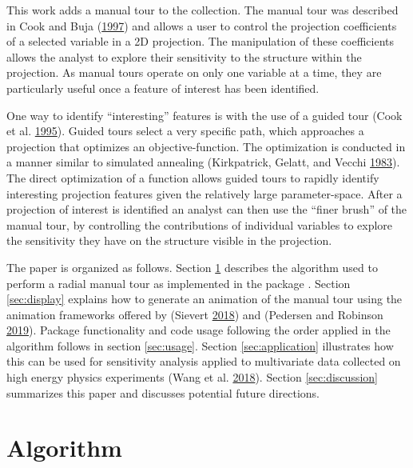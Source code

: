 This work adds a manual tour to the collection. The manual tour was
described in Cook and Buja
(\protect\hyperlink{ref-cook_manual_1997}{1997}) and allows a user to
control the projection coefficients of a selected variable in a 2D
projection. The manipulation of these coefficients allows the analyst to
explore their sensitivity to the structure within the projection. As
manual tours operate on only one variable at a time, they are
particularly useful once a feature of interest has been identified.

One way to identify ``interesting'' features is with the use of a guided
tour (Cook et al. \protect\hyperlink{ref-cook_grand_1995}{1995}). Guided
tours select a very specific path, which approaches a projection that
optimizes an objective-function. The optimization is conducted in a
manner similar to simulated annealing (Kirkpatrick, Gelatt, and Vecchi
\protect\hyperlink{ref-kirkpatrick_optimization_1983}{1983}). The direct
optimization of a function allows guided tours to rapidly identify
interesting projection features given the relatively large
parameter-space. After a projection of interest is identified an analyst
can then use the ``finer brush'' of the manual tour, by controlling the
contributions of individual variables to explore the sensitivity they
have on the structure visible in the projection.

The paper is organized as follows. Section \ref{sec:algorithm} describes
the algorithm used to perform a radial manual tour as implemented in the
package . Section \ref{sec:display} explains how to
generate an animation of the manual tour using the animation frameworks
offered by  (Sievert
\protect\hyperlink{ref-sievert_plotly_2018}{2018}) and
 (Pedersen and Robinson
\protect\hyperlink{ref-pedersen_gganimate:_2019}{2019}). Package
functionality and code usage following the order applied in the
algorithm follows in section \ref{sec:usage}. Section
\ref{sec:application} illustrates how this can be used for sensitivity
analysis applied to multivariate data collected on high energy physics
experiments (Wang et al.
\protect\hyperlink{ref-wang_mapping_2018}{2018}). Section
\ref{sec:discussion} summarizes this paper and discusses potential
future directions.

\hypertarget{sec:algorithm}{%
\section{Algorithm}\label{sec:algorithm}}


